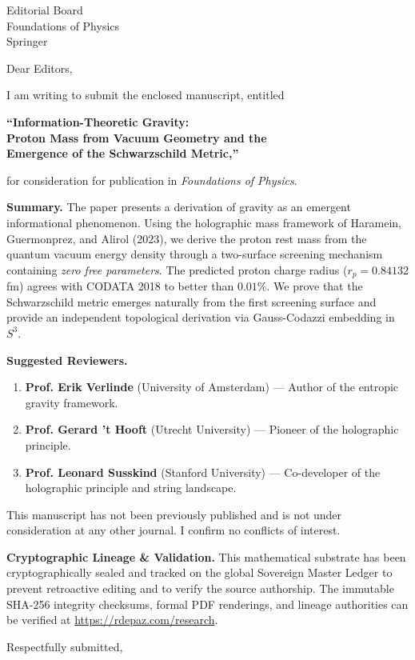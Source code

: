 \documentclass[12pt, a4paper]{letter}
\begin{document}
\begin{letter}{Editorial Board \\ Foundations of Physics \\ Springer}

\opening{Dear Editors,}

I am writing to submit the enclosed manuscript, entitled

\begin{center}
\textbf{``Information-Theoretic Gravity: \\
Proton Mass from Vacuum Geometry and the \\
Emergence of the Schwarzschild Metric,''}
\end{center}

\noindent for consideration for publication in \textit{Foundations of Physics}.

\medskip

\textbf{Summary.} The paper presents a derivation of gravity as an emergent
informational phenomenon. Using the holographic mass framework of Haramein,
Guermonprez, and Alirol (2023), we derive the proton rest mass from the
quantum vacuum energy density through a two-surface screening mechanism
containing \emph{zero free parameters}. The predicted proton charge radius
($r_p = 0.84132$ fm) agrees with CODATA 2018 to better than $0.01\%$.
We prove that the Schwarzschild metric emerges naturally from the first
screening surface and provide an independent topological derivation via
Gauss-Codazzi embedding in $S^3$.

\medskip

\textbf{Suggested Reviewers.}
\begin{enumerate}
  \item \textbf{Prof. Erik Verlinde} (University of Amsterdam) ---
    Author of the entropic gravity framework.
  \item \textbf{Prof. Gerard 't Hooft} (Utrecht University) ---
    Pioneer of the holographic principle.
  \item \textbf{Prof. Leonard Susskind} (Stanford University) ---
    Co-developer of the holographic principle and string landscape.
\end{enumerate}

\medskip

This manuscript has not been previously published and is not under consideration
at any other journal. I confirm no conflicts of interest.

\textbf{Cryptographic Lineage \& Validation.} This mathematical substrate has been cryptographically sealed and tracked on the global Sovereign Master Ledger to prevent retroactive editing and to verify the source authorship. The immutable SHA-256 integrity checksums, formal PDF renderings, and lineage authorities can be verified at \url{https://rdepaz.com/research}.

\medskip

\closing{Respectfully submitted,}
\end{letter}
\end{document}
